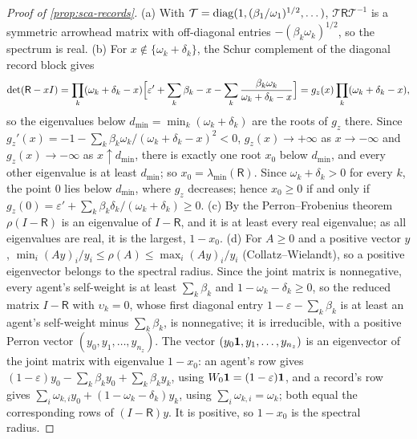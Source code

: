 \begin{proof}[Proof of \cref{prop:sca-records}]
(a) With $\mathcal T=\operatorname{diag}(1,(\beta_1/\omega_1)^{1/2},\dots)$, $\mathcal T\mathsf R\mathcal T^{-1}$ is a symmetric arrowhead matrix with off-diagonal entries $-(\beta_k\omega_k)^{1/2}$, so the spectrum is real. (b) For $x\notin\{\omega_k+\delta_k\}$, the Schur complement of the diagonal record block gives
\begin{equation*}
\det(\mathsf R-xI)=\prod_k(\omega_k+\delta_k-x)\Bigl[\varepsilon'+\sum_k\beta_k-x-\sum_k\frac{\beta_k\omega_k}{\omega_k+\delta_k-x}\Bigr]=g_z(x)\prod_k(\omega_k+\delta_k-x),
\end{equation*}
so the eigenvalues below $d_{\min}=\min_k(\omega_k+\delta_k)$ are the roots of $g_z$ there. Since $g_z'(x)=-1-\sum_k\beta_k\omega_k/(\omega_k+\delta_k-x)^2<0$, $g_z(x)\to+\infty$ as $x\to-\infty$ and $g_z(x)\to-\infty$ as $x\uparrow d_{\min}$, there is exactly one root $x_0$ below $d_{\min}$, and every other eigenvalue is at least $d_{\min}$; so $x_0=\lambda_{\min}(\mathsf R)$. Since $\omega_k+\delta_k>0$ for every $k$, the point $0$ lies below $d_{\min}$, where $g_z$ decreases; hence $x_0\ge0$ if and only if $g_z(0)=\varepsilon'+\sum_k\beta_k\delta_k/(\omega_k+\delta_k)\ge0$. (c) By the Perron--Frobenius theorem $\rho(I-\mathsf R)$ is an eigenvalue of $I-\mathsf R$, and it is at least every real eigenvalue; as all eigenvalues are real, it is the largest, $1-x_0$. (d) For $A\ge0$ and a positive vector $y$, $\min_i(Ay)_i/y_i\le\rho(A)\le\max_i(Ay)_i/y_i$ (Collatz--Wielandt), so a positive eigenvector belongs to the spectral radius. Since the joint matrix is nonnegative, every agent's self-weight is at least $\sum_k\beta_k$ and $1-\omega_k-\delta_k\ge0$, so the reduced matrix $I-\mathsf R$ with $\upsilon_k=0$, whose first diagonal entry $1-\varepsilon-\sum_k\beta_k$ is at least an agent's self-weight minus $\sum_k\beta_k$, is nonnegative; it is irreducible, with a positive Perron vector $(y_0,y_1,\dots,y_{n_z})$. The vector $(y_0\mathbf{1},y_1,\dots,y_{n_z})$ is an eigenvector of the joint matrix with eigenvalue $1-x_0$: an agent's row gives $(1-\varepsilon)y_0-\sum_k\beta_ky_0+\sum_k\beta_ky_k$, using $W_0\mathbf{1}=(1-\varepsilon)\mathbf{1}$, and a record's row gives $\sum_i\omega_{k,i}y_0+(1-\omega_k-\delta_k)y_k$, using $\sum_i\omega_{k,i}=\omega_k$; both equal the corresponding rows of $(I-\mathsf R)y$. It is positive, so $1-x_0$ is the spectral radius.
\end{proof}

